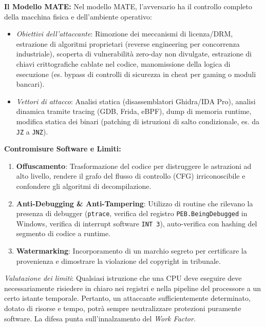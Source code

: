 \documentclass[11pt,a4paper]{article}
\begin{document}
\begin{solutionbox}
\textbf{Il Modello MATE:}
Nel modello MATE, l'avversario ha il controllo completo della macchina fisica e dell'ambiente operativo:
\begin{itemize}
    \item \textit{Obiettivi dell'attaccante}: Rimozione dei meccanismi di licenza/DRM, estrazione di algoritmi proprietari (reverse engineering per concorrenza industriale), scoperta di vulnerabilit\`a zero-day non divulgate, estrazione di chiavi crittografiche cablate nel codice, manomissione della logica di esecuzione (es. bypass di controlli di sicurezza in cheat per gaming o moduli bancari).
    \item \textit{Vettori di attacco}: Analisi statica (disassemblatori Ghidra/IDA Pro), analisi dinamica tramite tracing (GDB, Frida, eBPF), dump di memoria runtime, modifica statica dei binari (patching di istruzioni di salto condizionale, es. da \texttt{JZ} a \texttt{JNZ}).
\end{itemize}

\textbf{Contromisure Software e Limiti:}
\begin{enumerate}
    \item \textbf{Offuscamento}: Trasformazione del codice per distruggere le astrazioni ad alto livello, rendere il grafo del flusso di controllo (CFG) irriconoscibile e confondere gli algoritmi di decompilazione.
    \item \textbf{Anti-Debugging \& Anti-Tampering}: Utilizzo di routine che rilevano la presenza di debugger (\texttt{ptrace}, verifica del registro \texttt{PEB.BeingDebugged} in Windows, verifica di interrupt software \texttt{INT 3}), auto-verifica con hashing del segmento di codice a runtime.
    \item \textbf{Watermarking}: Incorporamento di un marchio segreto per certificare la provenienza e dimostrare la violazione del copyright in tribunale.
\end{enumerate}
\textit{Valutazione dei limiti}: Qualsiasi istruzione che una CPU deve eseguire deve necessariamente risiedere in chiaro nei registri e nella pipeline del processore a un certo istante temporale. Pertanto, un attaccante sufficientemente determinato, dotato di risorse e tempo, potr\`a sempre neutralizzare protezioni puramente software. La difesa punta sull'innalzamento del \textit{Work Factor}.
\end{solutionbox}
\end{document}
